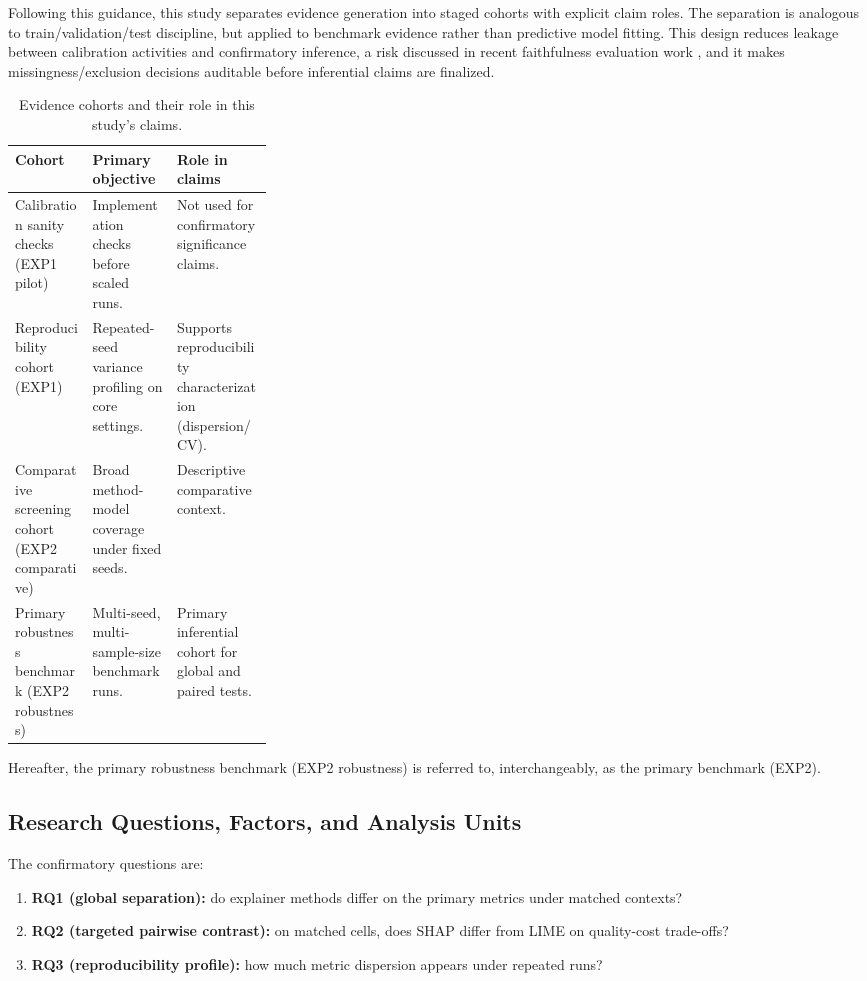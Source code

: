 \documentclass[twoside,11pt]{article}
\begin{document}
Following this guidance, this study separates evidence generation into staged
cohorts with explicit claim roles. The separation is analogous to
train/validation/test discipline, but applied to benchmark evidence rather than
predictive model fitting. This design reduces leakage between calibration
activities and confirmatory inference, a risk discussed in recent faithfulness
evaluation work \citep{zheng2025ffidelity}, and it makes missingness/exclusion
decisions auditable before inferential claims are finalized.
\begin{table}[t]
\centering
\caption{Evidence cohorts and their role in this study's claims.}
\begin{tabularx}{\linewidth}{>{\raggedright\arraybackslash}p{0.30\linewidth} X X}
\toprule
\textbf{Cohort} & \textbf{Primary objective} & \textbf{Role in claims} \\
\midrule
Calibration sanity checks (EXP1 pilot) & Implementation checks before scaled runs. & Not used for confirmatory significance claims. \\
Reproducibility cohort (EXP1) & Repeated-seed variance profiling on core settings. & Supports reproducibility characterization (dispersion/CV). \\
Comparative screening cohort (EXP2 comparative) & Broad method-model coverage under fixed seeds. & Descriptive comparative context. \\
Primary robustness benchmark (EXP2 robustness) & Multi-seed, multi-sample-size benchmark runs. & Primary inferential cohort for global and paired tests. \\
\bottomrule
\end{tabularx}
\label{tab:cohorts}
\end{table}
Hereafter, the primary robustness benchmark (EXP2 robustness) is referred to,
interchangeably, as the primary benchmark (EXP2).

\subsection{Research Questions, Factors, and Analysis Units}
\label{sec:methods-design}
The confirmatory questions are:
\begin{enumerate}[leftmargin=*]
    \item \textbf{RQ1 (global separation):} do explainer methods differ on the primary metrics under matched contexts?
    \item \textbf{RQ2 (targeted pairwise contrast):} on matched cells, does SHAP differ from LIME on quality-cost trade-offs?
    \item \textbf{RQ3 (reproducibility profile):} how much metric dispersion appears under repeated runs?
\end{enumerate}
\end{document}

